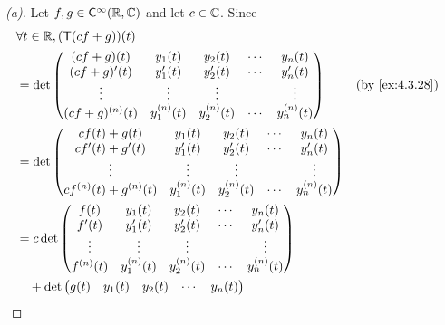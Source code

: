 \begin{proof}[(a)]
  Let \(f, g \in \cfs[\infty](\R, \C)\) and let \(c \in \mathbb{C}\).
  Since
  \begin{align*}
     & \forall t \in \R, (\T(cf + g))(t)                                                                     \\
     & = \det\begin{pmatrix}
               (cf + g)(t)       & y_1(t)       & y_2(t)       & \cdots & y_n(t)       \\
               (cf + g)'(t)      & y_1'(t)      & y_2'(t)      & \cdots & y_n'(t)      \\
               \vdots            & \vdots       & \vdots       &        & \vdots       \\
               (cf + g)^{(n)}(t) & y_1^{(n)}(t) & y_2^{(n)}(t) & \cdots & y_n^{(n)}(t)
             \end{pmatrix}        &  & \by{ex:4.3.28}                         \\
     & = \det\begin{pmatrix}
               cf(t) + g(t)             & y_1(t)       & y_2(t)       & \cdots & y_n(t)       \\
               cf'(t) + g'(t)           & y_1'(t)      & y_2'(t)      & \cdots & y_n'(t)      \\
               \vdots                   & \vdots       & \vdots       &        & \vdots       \\
               cf^{(n)}(t) + g^{(n)}(t) & y_1^{(n)}(t) & y_2^{(n)}(t) & \cdots & y_n^{(n)}(t)
             \end{pmatrix}                  \\
     & = c \det\begin{pmatrix}
                 f(t)       & y_1(t)       & y_2(t)       & \cdots & y_n(t)       \\
                 f'(t)      & y_1'(t)      & y_2'(t)      & \cdots & y_n'(t)      \\
                 \vdots     & \vdots       & \vdots       &        & \vdots       \\
                 f^{(n)}(t) & y_1^{(n)}(t) & y_2^{(n)}(t) & \cdots & y_n^{(n)}(t)
               \end{pmatrix}                              \\
     & \quad + \det\begin{pmatrix}
                     g(t)       & y_1(t)       & y_2(t)       & \cdots & y_n(t)       \\

\end{pmatrix}
\end{align*}
\end{proof}
